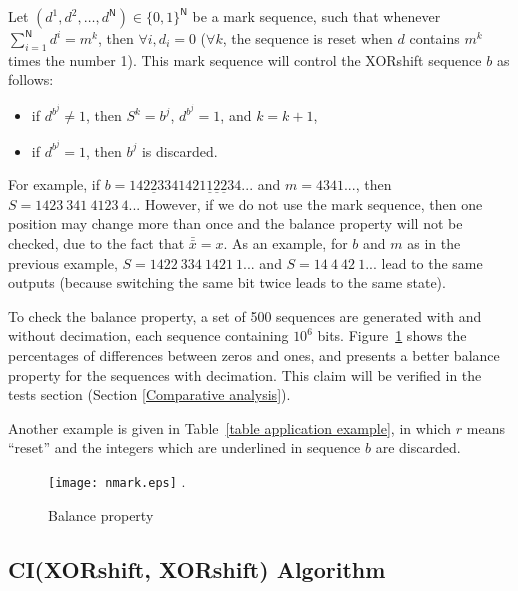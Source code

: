 \documentclass[journal]{IEEEtran}
\begin{document}
Let $(d^1,d^2,\dots,d^\mathsf{N})\in \{0,1\}^\mathsf{N}$ be a mark sequence, such that whenever $\sum_{i=1}^\mathsf{N} d^i = m^k$,
then $\forall i, d_i=0$ ($\forall k$, the sequence is reset when $d$ contains $m^k$ times the number 1). This mark sequence will control the XORshift sequence $b$ as follows:
\begin{itemize}
\item if $d^{b^j} \neq 1$, then $S^k=b^j$, $d^{b^j} = 1$, and $k = k+1$,
\item if $d^{b^j}=1$, then $b^j$ is discarded.
\end{itemize}
For example, if $b = 142\underline{2}334 1421\underline{1}\underline{2}\underline{2}34...$ and $m = 4341...$, then $S=1423~341~4123~4...$ However, if we do not use the mark sequence, then one position may change more than once and the balance property will not be checked, due to the fact that $\bar{\bar{x}}=x$. As an example, for $b$ and $m$ as in the previous example, $S=1422~334~1421~1...$ and $S=14~4~42~1...$ lead to the same outputs (because switching the same bit twice leads to the same state).

 
To check the balance property, a set of 500
sequences are generated with and without decimation, each
sequence containing $10^6$ bits. Figure~\ref{nmark} shows the
percentages of differences between zeros and ones, and presents a better balance property for the sequences with decimation. This claim will be verified in the tests section (Section \ref{Comparative analysis}). 


Another example is given in Table~\ref{table application example}, in which $r$ means ``reset'' and the integers which are underlined in sequence $b$ are discarded.







\begin{figure}
\centering
\texttt{[image: nmark.eps]}
\DeclareGraphicsExtensions.
\caption{Balance property}
\label{nmark}
\end{figure}

\subsection{CI(XORshift, XORshift) Algorithm}
\end{document}

